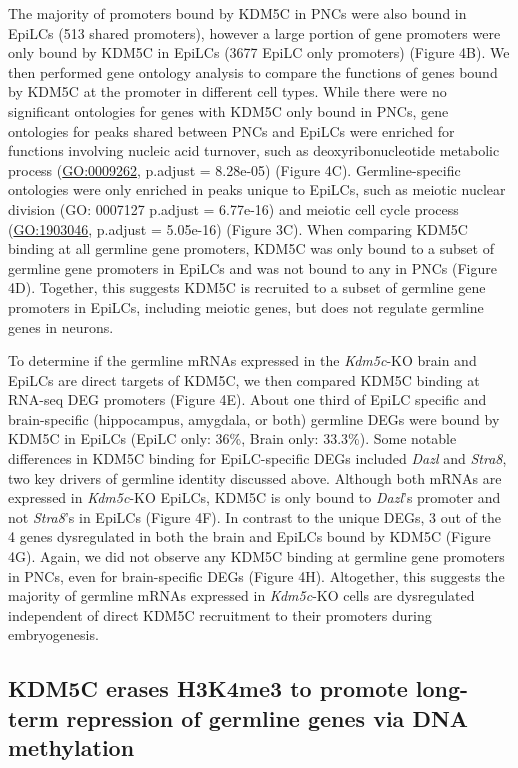 \documentclass[
]{article}
\begin{document}
The majority of promoters bound by KDM5C in PNCs were also bound in
EpiLCs (513 shared promoters), however a large portion of gene promoters
were only bound by KDM5C in EpiLCs (3677 EpiLC only promoters) (Figure
4B). We then performed gene ontology analysis to compare the functions
of genes bound by KDM5C at the promoter in different cell types. While
there were no significant ontologies for genes with KDM5C only bound in
PNCs, gene ontologies for peaks shared between PNCs and EpiLCs were
enriched for functions involving nucleic acid turnover, such as
deoxyribonucleotide metabolic process (\url{GO:0009262}, p.adjust =
8.28e-05) (Figure 4C). Germline-specific ontologies were only enriched
in peaks unique to EpiLCs, such as meiotic nuclear division (GO: 0007127
p.adjust = 6.77e-16) and meiotic cell cycle process (\url{GO:1903046},
p.adjust = 5.05e-16) (Figure 3C). When comparing KDM5C binding at all
germline gene promoters, KDM5C was only bound to a subset of germline
gene promoters in EpiLCs and was not bound to any in PNCs (Figure 4D).
Together, this suggests KDM5C is recruited to a subset of germline gene
promoters in EpiLCs, including meiotic genes, but does not regulate
germline genes in neurons.

To determine if the germline mRNAs expressed in the \emph{Kdm5c}-KO
brain and EpiLCs are direct targets of KDM5C, we then compared KDM5C
binding at RNA-seq DEG promoters (Figure 4E). About one third of EpiLC
specific and brain-specific (hippocampus, amygdala, or both) germline
DEGs were bound by KDM5C in EpiLCs (EpiLC only: 36\%, Brain only:
33.3\%). Some notable differences in KDM5C binding for EpiLC-specific
DEGs included \emph{Dazl} and \emph{Stra8}, two key drivers of germline
identity discussed above. Although both mRNAs are expressed in
\emph{Kdm5c}-KO EpiLCs, KDM5C is only bound to \emph{Dazl}'s promoter
and not \emph{Stra8}'s in EpiLCs (Figure 4F). In contrast to the unique
DEGs, 3 out of the 4 genes dysregulated in both the brain and EpiLCs
bound by KDM5C (Figure 4G). Again, we did not observe any KDM5C binding
at germline gene promoters in PNCs, even for brain-specific DEGs (Figure
4H). Altogether, this suggests the majority of germline mRNAs expressed
in \emph{Kdm5c}-KO cells are dysregulated independent of direct KDM5C
recruitment to their promoters during embryogenesis.

\hypertarget{kdm5c-erases-h3k4me3-to-promote-long-term-repression-of-germline-genes-via-dna-methylation}{%
\subsection{KDM5C erases H3K4me3 to promote long-term repression of
germline genes via DNA
methylation}\label{kdm5c-erases-h3k4me3-to-promote-long-term-repression-of-germline-genes-via-dna-methylation}}
\end{document}
